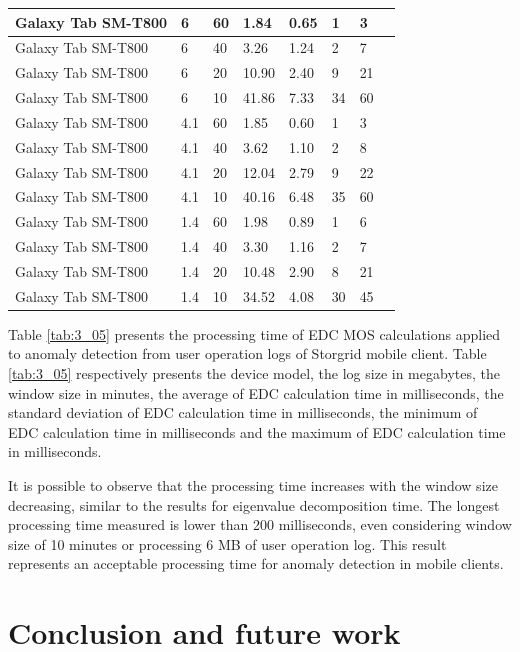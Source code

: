 \begin{table}[!t]
\begin{tabular}{|l|l|l|l|l|l|l|l|}
		Galaxy Tab SM-T800	& 6	& 60	& 1.84	& 0.65	& 1	& 3	\\ \hline
		Galaxy Tab SM-T800	& 6	& 40	& 3.26	& 1.24	& 2	& 7	\\ \hline
		Galaxy Tab SM-T800	& 6	& 20	& 10.90	& 2.40	& 9	& 21	\\ \hline
		Galaxy Tab SM-T800	& 6	& 10	& 41.86	& 7.33	& 34	& 60	\\ \hline
		Galaxy Tab SM-T800	& 4.1	& 60	& 1.85	& 0.60	& 1	& 3	\\ \hline
		Galaxy Tab SM-T800	& 4.1	& 40	& 3.62	& 1.10	& 2	& 8	\\ \hline
		Galaxy Tab SM-T800	& 4.1	& 20	& 12.04	& 2.79	& 9	& 22	\\ \hline
		Galaxy Tab SM-T800	& 4.1	& 10	& 40.16	& 6.48	& 35	& 60	\\ \hline
		Galaxy Tab SM-T800	& 1.4	& 60	& 1.98	& 0.89	& 1	& 6	\\ \hline
		Galaxy Tab SM-T800	& 1.4	& 40	& 3.30	& 1.16	& 2	& 7	\\ \hline
		Galaxy Tab SM-T800	& 1.4	& 20	& 10.48	& 2.90	& 8	& 21	\\ \hline
		Galaxy Tab SM-T800	& 1.4	& 10	& 34.52	& 4.08	& 30	& 45	\\ \hline
	\end{tabular}
\end{table}

Table \ref{tab:3_05} presents the processing time of EDC MOS calculations applied to anomaly detection from user operation logs of Storgrid mobile client. Table \ref{tab:3_05} respectively presents the device model, the log size in megabytes, the window size in minutes, the average of EDC calculation time in milliseconds, the standard deviation of EDC calculation time in milliseconds, the minimum of EDC calculation time in milliseconds and the maximum of EDC calculation time in milliseconds.

It is possible to observe that the processing time increases with the window size decreasing, similar to the results for eigenvalue decomposition time. The longest processing time measured is lower than 200 milliseconds, even considering window size of 10 minutes or processing 6 MB of user operation log. This result represents an acceptable processing time for anomaly detection in mobile clients.

\section{Conclusion and future work}
\label{sec:3_conclusion}

